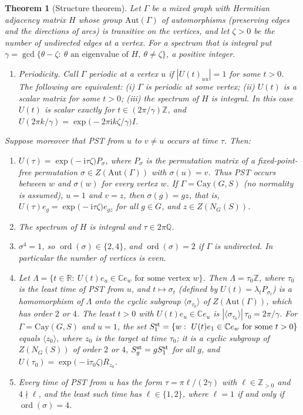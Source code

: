 \documentclass[preprint,11pt]{elsarticle}
\newtheorem{theorem}{Theorem}[section]
\theoremstyle{definition}
\theoremstyle{remark}
\DeclareMathOperator{\ord}{ord}
\newcommand{\Z}{\mathbb Z}
\newcommand{\Q}{\mathbb Q}
\newcommand{\ii}{\mathrm i}
\begin{document}
\begin{theorem}[Structure theorem]\label{thm:G}
Let $\Gamma$ be a mixed graph with Hermitian adjacency matrix $H$ whose group $\mathrm{Aut}(\Gamma)$ of automorphisms (preserving edges and the directions of arcs) is transitive on the vertices, and let $\zeta>0$ be the number of undirected edges at a vertex. For a spectrum that is integral put $\gamma=\gcd\{\theta-\zeta:\ \theta\text{ an eigenvalue of }H,\ \theta\ne\zeta\}$, a positive integer.
\begin{enumerate}
\item[(P)] \emph{Periodicity.} Call $\Gamma$ periodic at a vertex $u$ if $|U(t)_{uu}|=1$ for some $t>0$. The following are equivalent: (i) $\Gamma$ is periodic at some vertex; (ii) $U(t)$ is a scalar matrix for some $t>0$; (iii) the spectrum of $H$ is integral. In this case $U(t)$ is scalar exactly for $t\in(2\pi/\gamma)\Z$, and $U(2\pi k/\gamma)=\exp\bigl(-2\pi\ii k\zeta/\gamma\bigr)I$.
\end{enumerate}
Suppose moreover that PST from $u$ to $v\ne u$ occurs at time $\tau$. Then:
\begin{enumerate}
\item[(a)] $U(\tau)=\exp\bigl(-\ii\tau\zeta\bigr)P_\sigma$, where $P_\sigma$ is the permutation matrix of a fixed-point-free permutation $\sigma\in Z(\mathrm{Aut}(\Gamma))$ with $\sigma(u)=v$. Thus PST occurs between $w$ and $\sigma(w)$ for every vertex $w$. If $\Gamma=\mathrm{Cay}(G,S)$ (no normality is assumed), $u=1$ and $v=z$, then $\sigma(g)=gz$, that is, $U(\tau)e_g=\exp\bigl(-\ii\tau\zeta\bigr)e_{gz}$ for all $g\in G$, and $z\in Z(N_G(S))$.
\item[(b)] The spectrum of $H$ is integral and $\tau\in2\pi\Q$.
\item[(c)] $\sigma^4=1$, so $\ord(\sigma)\in\{2,4\}$, and $\ord(\sigma)=2$ if $\Gamma$ is undirected. In particular the number of vertices is even.
\item[(d)] Let $\Lambda=\{t\in\mathbb R:\ U(t)e_u\in\mathbb Ce_w\text{ for some vertex }w\}$. Then $\Lambda=\tau_0\Z$, where $\tau_0$ is the least time of PST from $u$, and $t\mapsto\sigma_t$ (defined by $U(t)=\lambda_tP_{\sigma_t}$) is a homomorphism of $\Lambda$ onto the cyclic subgroup $\langle\sigma_{\tau_0}\rangle$ of $Z(\mathrm{Aut}(\Gamma))$, which has order $2$ or $4$. The least $t>0$ with $U(t)e_u\in\mathbb Ce_u$ is $|\langle\sigma_{\tau_0}\rangle|\,\tau_0=2\pi/\gamma$. For $\Gamma=\mathrm{Cay}(G,S)$ and $u=1$, the set $S_1^{\rm st}=\{w:\ U(t)e_1\in\mathbb Ce_w\text{ for some }t>0\}$ equals $\langle z_0\rangle$, where $z_0$ is the target at time $\tau_0$; it is a cyclic subgroup of $Z(N_G(S))$ of order $2$ or $4$, $S_g^{\rm st}=gS_1^{\rm st}$ for all $g$, and $U(\tau_0)=\exp\bigl(-\ii\tau_0\zeta\bigr)R_{z_0}$.
\item[(e)] Every time of PST from $u$ has the form $\tau=\pi\ell/(2\gamma)$ with $\ell\in\Z_{>0}$ and $4\nmid\ell$, and the least such time has $\ell\in\{1,2\}$, where $\ell=1$ if and only if $\ord(\sigma)=4$.
\end{enumerate}
\end{theorem}
\end{document}
